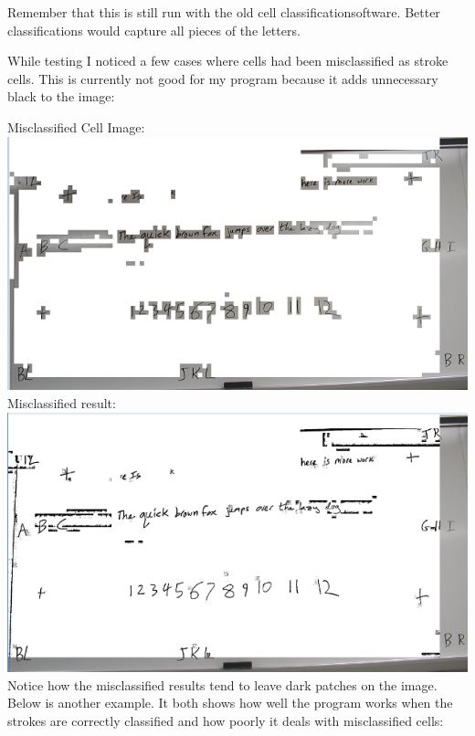 \documentclass[]{article}
\begin{document}
	Remember that this is still run with the old cell classificationsoftware. Better classifications would capture all pieces of the letters.
	
	While testing I noticed a few cases where cells had been misclassified as stroke cells. This is currently not good for my program because it adds unnecessary black to the image:
	
	Misclassified Cell Image: \\
	\includegraphics[scale=1]{images/Misclassify.png} \\
	
	Misclassified result: \\
	\includegraphics[scale=1]{images/misClasResult.png} \\
	
	Notice how the misclassified results tend to leave dark patches on the image.  Below is another example. It both shows how well the program works when the strokes are correctly classified and how poorly it deals with misclassified cells: \\ 
	
\end{document}
